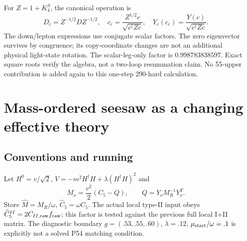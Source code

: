 \documentclass[11pt]{article}
\begin{document}
For $Z=1+K_4^S$, the canonical operation is
\begin{equation}
 D_c=Z^{-1/2}DZ^{-1/2},\quad
 c_c=\frac{Z^{1/2}c}{\sqrt{c^\dagger Zc}},\quad
 Y_c(c_c)=\frac{Y(c)}{\sqrt{c^\dagger Zc}}.
\end{equation}
The down/lepton expressions use conjugate scalar factors. The zero
eigenvector survives by congruence; its copy-coordinate changes are
not an additional physical light-state rotation. The scalar-leg-only
factor is $0.998783838597$. Exact square roots verify the algebra,
not a two-loop resummation claim. No 55-upper contribution is added
again to this one-step 290-hard calculation.

\section{Mass-ordered seesaw as a changing effective theory}
\subsection{Conventions and running}
Let $H^0=v/\sqrt2$, $V=-m^2H^\dagger H+\lambda(H^\dagger H)^2$ and
\begin{equation}
 M_\nu=\frac{v^2}{2}(C_5-Q),\qquad Q=Y_\nu M_R^{-1}Y_\nu^T.
 \label{eq:Cconvention}
\end{equation}
Store $\widehat M=M_R/\omega$, $\widehat C_5=\omega C_5$.
The actual local type-II input obeys
$\widehat C_5^{II}=2C_{II,\rm raw}f_{\rm raw}$; this factor is tested
against the previous full local I+II matrix. The diagnostic boundary
$g=(.53,.55,.60)$, $\lambda=.12$, $\mu_{\rm start}/\omega=.1$ is
explicitly not a solved P54 matching condition.
\end{document}
